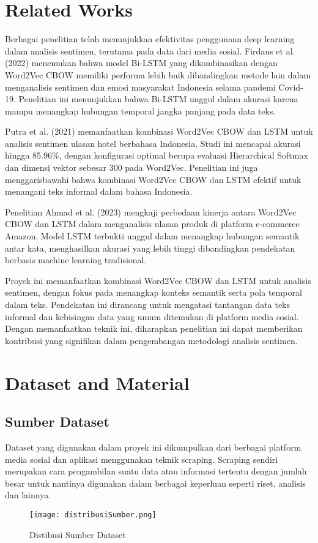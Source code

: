 \documentclass[12pt,a4paper]{article}
\begin{document}
\section{Related Works}

Berbagai penelitian telah menunjukkan efektivitas penggunaan deep learning dalam analisis sentimen, terutama pada data dari media sosial. Firdaus et al. (2022) menemukan bahwa model Bi-LSTM yang dikombinasikan dengan Word2Vec CBOW memiliki performa lebih baik dibandingkan metode lain dalam menganalisis sentimen dan emosi masyarakat Indonesia selama pandemi Covid-19. Penelitian ini menunjukkan bahwa Bi-LSTM unggul dalam akurasi karena mampu menangkap hubungan temporal jangka panjang pada data teks\cite{Kamarula2022}.

Putra et al. (2021) memanfaatkan kombinasi Word2Vec CBOW dan LSTM untuk analisis sentimen ulasan hotel berbahasa Indonesia. Studi ini mencapai akurasi hingga 85.96\%, dengan konfigurasi optimal berupa evaluasi Hierarchical Softmax dan dimensi vektor sebesar 300 pada Word2Vec. Penelitian ini juga menggarisbawahi bahwa kombinasi Word2Vec CBOW dan LSTM efektif untuk menangani teks informal dalam bahasa Indonesia\cite{Muhammad2021}.

Penelitian Ahmad et al. (2023) mengkaji perbedaan kinerja antara Word2Vec CBOW dan LSTM dalam menganalisis ulasan produk di platform e-commerce Amazon. Model LSTM terbukti unggul dalam menangkap hubungan semantik antar kata, menghasilkan akurasi yang lebih tinggi dibandingkan pendekatan berbasis machine learning tradisional\cite{Ahmad2023}.

Proyek ini memanfaatkan kombinasi Word2Vec CBOW dan LSTM untuk analisis sentimen, dengan fokus pada menangkap konteks semantik serta pola temporal dalam teks. Pendekatan ini dirancang untuk mengatasi tantangan data teks informal dan kebisingan data yang umum ditemukan di platform media sosial. Dengan memanfaatkan teknik ini, diharapkan penelitian ini dapat memberikan kontribusi yang signifikan dalam pengembangan metodologi analisis sentimen.

\section{Dataset and Material}
\subsection{Sumber Dataset}
Dataset yang digunakan dalam proyek ini dikumpulkan dari berbagai platform media sosial dan aplikasi menggunakan teknik scraping. Scraping sendiri merupakan cara pengambilan suatu data atau informasi tertentu dengan jumlah besar untuk nantinya digunakan dalam berbagai keperluan seperti riset, analisis dan lainnya\cite{Telkom2024}. 
\begin{figure}[h!]
    \centering
    \texttt{[image: distribusiSumber.png]}
    \caption{Distibusi Sumber Dataset}
    \label{fig:result}
\end{figure}
\end{document}
